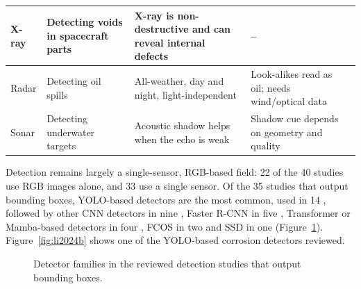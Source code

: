 {\begin{xltabular}{\textwidth}{>{\RaggedRight\arraybackslash}p{2.1cm}>{\RaggedRight\arraybackslash}p{2.9cm}>{\RaggedRight\arraybackslash}X>{\RaggedRight\arraybackslash}Xp{0.95cm}}
\midrule
X-ray & Detecting voids in spacecraft parts & X-ray is non-destructive and can reveal internal defects & -- & \citep{Gong2022} \\
\midrule
Radar & Detecting oil spills & All-weather, day and night, light-independent & Look-alikes read as oil; needs wind/optical data & \citep{Zhao2026} \\
\midrule
Sonar & Detecting underwater targets & Acoustic shadow helps when the echo is weak & Shadow cue depends on geometry and quality & \citep{He2026} \\
\end{xltabular}
}


Detection remains largely a single-sensor, RGB-based field: 22 of the 40 studies
use RGB images alone, and 33 use a single sensor. Of the 35 studies that output
bounding boxes, YOLO-based detectors are the most common, used in 14
\citep{Srivastava2021,Tao2021,Sun2023,Liu2026a,Wang2026a,Sun2022,Li2024b,Morita2024,Zhao2026,Hou2024,Liu2026c,Wang2024b,Wen2025,Yu2023}, followed by other
CNN detectors in nine \citep{Jiang2025,Mbietieu2025,Lalitha2022,He2026,Chang2024,Jiang2024,Naich2024,Prasanth2026,Soumya2026}, Faster R-CNN in
five \citep{Wu2026,Wu2023,Zheng2023,Gong2022,Lim2021}, Transformer or Mamba-based detectors in four
\citep{Zhang2026c,Cheng2025,Wang2026b,Tran2025}, FCOS in two \citep{Chen2025,Zhang2024} and SSD in one \citep{Han2022}
(Figure~\ref{fig:detectors}). Figure~\ref{fig:li2024b} shows one of the YOLO-based corrosion
detectors reviewed.


\begin{figure}[htbp]
\centering
{}
\caption{Detector families in the reviewed detection studies that output bounding boxes.}
\label{fig:detectors}
\end{figure}

